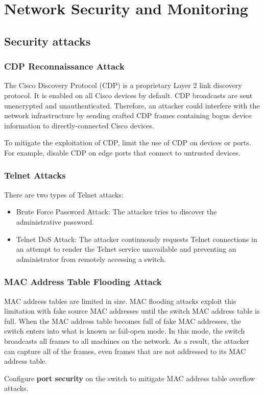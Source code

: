 \chapter{Network Security and Monitoring}
\section{Security attacks}
\subsection{CDP Reconnaissance Attack}
The Cisco Discovery Protocol (CDP) is a proprietary Layer 2 link discovery protocol. It is enabled on all Cisco devices by default. CDP broadcasts are sent unencrypted and unauthenticated. Therefore, an attacker could interfere with the network infrastructure by sending crafted CDP frames containing bogus device information to directly-connected Cisco devices. \par 
To mitigate the exploitation of CDP, limit the use of CDP on devices or ports. For example, disable CDP on edge ports that connect to untrusted devices. 
\subsection{Telnet Attacks}
There are two types of Telnet attacks:
\begin{itemize}
\item Brute Force Password Attack: The attacker tries to discover the administrative password. 
\item Telnet DoS Attack: The attacker continuously requests Telnet connections in an attempt to render the Telnet service unavailable and preventing an administrator from remotely accessing a switch.
\end{itemize}
\subsection{MAC Address Table Flooding Attack}
MAC address tables are limited in size. MAC flooding attacks exploit this limitation with fake source MAC addresses until the switch MAC address table is full. When the MAC address table becomes full of fake MAC addresses, the switch enters into what is known as fail-open mode. In this mode, the switch broadcasts all frames to all machines on the network. As a result, the attacker can capture all of the frames, even frames that are not addressed to its MAC address table.\par 
Configure \textbf{port security} on the switch to mitigate MAC address table overflow attacks.
